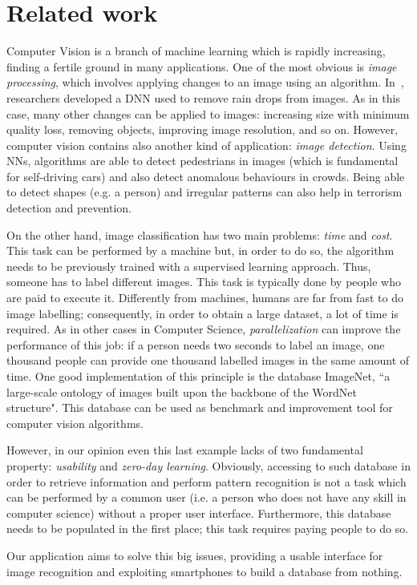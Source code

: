 \section{Related work}
\label{sec:related}

Computer Vision is a branch of machine learning which is rapidly increasing, 
finding a fertile ground in many applications. One of the most obvious is 
\textit{image processing}, which involves applying changes to an image using an 
algorithm. In~\cite{Rain}, researchers developed a DNN used to remove rain drops 
from images. As in this case, many other changes can be applied to images: 
increasing size with minimum quality loss, removing objects, improving image 
resolution, and so on. However, computer vision contains also another kind of 
application: \textit{image detection}. Using NNs, algorithms are able to detect 
pedestrians in images\cite{Pedestrian} (which is fundamental for self-driving 
cars) and also detect anomalous behaviours in crowds\cite{Crowd}. Being able to 
detect shapes (e.g. a person) and irregular patterns can also help in terrorism 
detection and prevention.

On the other hand, image classification has two main problems: \textit{time} and 
\textit{cost}. This task can be performed by a machine but, in order to do so, 
the algorithm needs to be previously trained with a supervised learning 
approach. Thus, someone has to label different images. This task is typically 
done by people who are paid to execute it. Differently from machines, humans are 
far from fast to do image labelling; consequently, in order to obtain a large 
dataset, a lot of time is required.
As in other cases in Computer Science, \textit{parallelization} can improve the 
performance of this job: if a person needs two seconds to label an image, one 
thousand people can provide one thousand labelled images in the same amount of 
time. One good implementation of this principle is the database 
ImageNet\cite{ImageNet2}, ``a large-scale ontology of images built upon the 
backbone of the WordNet structure"\cite{ImageNet1}. This database can be used as 
benchmark and improvement tool for computer vision algorithms.

However, in our opinion even this last example lacks of two fundamental 
property: \textit{usability} and \textit{zero-day learning}. Obviously, 
accessing to such database in order to retrieve information and perform pattern 
recognition is not a task which can be performed by a common user (i.e. a person 
who does not have any skill in computer science) without a proper user 
interface. Furthermore, this database needs to be populated in the first place; 
this task requires paying people to do so.

Our application aims to solve this big issues, providing a usable interface for 
image recognition and exploiting smartphones to build a database from nothing.
